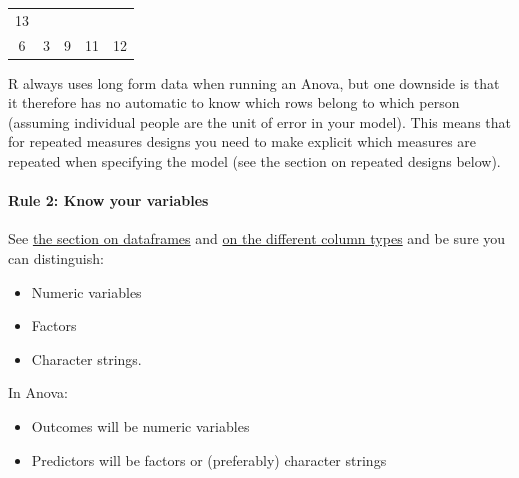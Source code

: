 \documentclass[]{article}
\providecommand{\tightlist}{%
  \setlength{\itemsep}{0pt}\setlength{\parskip}{0pt}}
\let\oldparagraph\paragraph
\renewcommand{\paragraph}[1]{\oldparagraph{#1}\mbox{}}
\theoremstyle{definition}
\theoremstyle{definition}
\theoremstyle{definition}
\theoremstyle{remark}
\begin{document}
\begin{longtable}[]{@{}ccccc@{}}
\begin{minipage}[t]{0.11\columnwidth}
13\strut
\end{minipage}\tabularnewline
\begin{minipage}[t]{0.11\columnwidth}\centering\strut
6\strut
\end{minipage} & \begin{minipage}[t]{0.14\columnwidth}\centering\strut
3\strut
\end{minipage} & \begin{minipage}[t]{0.11\columnwidth}\centering\strut
9\strut
\end{minipage} & \begin{minipage}[t]{0.11\columnwidth}\centering\strut
11\strut
\end{minipage} & \begin{minipage}[t]{0.11\columnwidth}\centering\strut
12\strut
\end{minipage}\tabularnewline
\bottomrule
\end{longtable}

R always uses long form data when running an Anova, but one downside is
that it therefore has no automatic to know which rows belong to which
person (assuming individual people are the unit of error in your model).
This means that for repeated measures designs you need to make explicit
which measures are repeated when specifying the model (see the section
on repeated designs below).

\paragraph{Rule 2: Know your
variables}\label{rule-2-know-your-variables}

See \protect\hyperlink{datasets-dataframes}{the section on dataframes}
and \protect\hyperlink{factors-and-numerics}{on the different column
types} and be sure you can distinguish:

\begin{itemize}
\tightlist
\item
  Numeric variables
\item
  Factors
\item
  Character strings.
\end{itemize}

In Anova:

\begin{itemize}
\tightlist
\item
  Outcomes will be numeric variables
\item
  Predictors will be factors or (preferably) character strings
\end{itemize}
\end{document}
